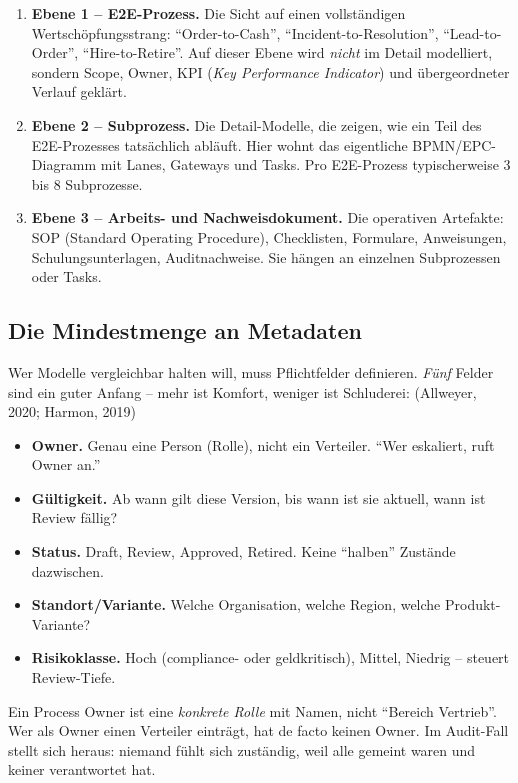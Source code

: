 \documentclass[11pt,a4paper,oneside]{article}
\newcommand{\fachbegriff}[1]{\textbf{#1}}
\newcommand{\quelle}[1]{{\footnotesize\color{lpGray}(#1)}}
\begin{document}
\begin{enumerate}
  \item \fachbegriff{Ebene 1 -- E2E-Prozess.} Die Sicht auf einen vollständigen Wertschöpfungsstrang: ``Order-to-Cash'', ``Incident-to-Resolution'', ``Lead-to-Order'', ``Hire-to-Retire''. Auf dieser Ebene wird \emph{nicht} im Detail modelliert, sondern Scope, Owner, KPI (\emph{Key Performance Indicator}) und übergeordneter Verlauf geklärt.
  \item \fachbegriff{Ebene 2 -- Subprozess.} Die Detail-Modelle, die zeigen, wie ein Teil des E2E-Prozesses tatsächlich abläuft. Hier wohnt das eigentliche BPMN/EPC-Diagramm mit Lanes, Gateways und Tasks. Pro E2E-Prozess typischerweise 3 bis 8 Subprozesse.
  \item \fachbegriff{Ebene 3 -- Arbeits- und Nachweisdokument.} Die operativen Artefakte: SOP (Standard Operating Procedure), Checklisten, Formulare, Anweisungen, Schulungsunterlagen, Auditnachweise. Sie hängen an einzelnen Subprozessen oder Tasks.
\end{enumerate}

\subsection{Die Mindestmenge an Metadaten}

Wer Modelle vergleichbar halten will, muss Pflichtfelder definieren. \emph{Fünf} Felder sind ein guter Anfang -- mehr ist Komfort, weniger ist Schluderei: \quelle{Allweyer, 2020; Harmon, 2019}

\begin{itemize}
  \item \textbf{Owner.} Genau eine Person (Rolle), nicht ein Verteiler. ``Wer eskaliert, ruft Owner an.''
  \item \textbf{Gültigkeit.} Ab wann gilt diese Version, bis wann ist sie aktuell, wann ist Review fällig?
  \item \textbf{Status.} Draft, Review, Approved, Retired. Keine ``halben'' Zustände dazwischen.
  \item \textbf{Standort/Variante.} Welche Organisation, welche Region, welche Produkt-Variante?
  \item \textbf{Risikoklasse.} Hoch (compliance- oder geldkritisch), Mittel, Niedrig -- steuert Review-Tiefe.
\end{itemize}

\begin{merkbox}
Ein Process Owner ist eine \emph{konkrete Rolle} mit Namen, nicht ``Bereich Vertrieb''. Wer als Owner einen Verteiler einträgt, hat de facto keinen Owner. Im Audit-Fall stellt sich heraus: niemand fühlt sich zuständig, weil alle gemeint waren und keiner verantwortet hat.
\end{merkbox}
\end{document}
